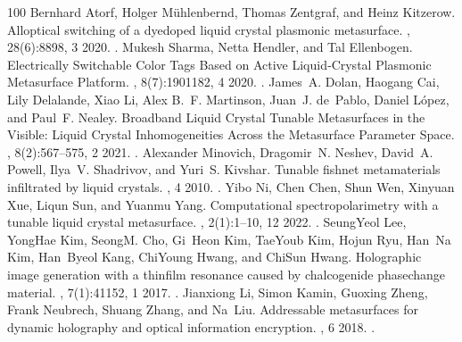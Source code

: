 \documentclass[a4paper,10pt,english,openany,oneside]{jupyterBook}
\begin{document}
\begin{sphinxthebibliography}{100}
\sphinxAtStartPar
Bernhard Atorf, Holger Mühlenbernd, Thomas Zentgraf, and Heinz Kitzerow. All\sphinxhyphen{}optical switching of a dye\sphinxhyphen{}doped liquid crystal plasmonic metasurface. , 28(6):8898, 3 2020. .
\sphinxAtStartPar
Mukesh Sharma, Netta Hendler, and Tal Ellenbogen. Electrically Switchable Color Tags Based on Active Liquid‐Crystal Plasmonic Metasurface Platform. , 8(7):1901182, 4 2020. .
\sphinxAtStartPar
James A. Dolan, Haogang Cai, Lily Delalande, Xiao Li, Alex B. F. Martinson, Juan J. de Pablo, Daniel López, and Paul F. Nealey. Broadband Liquid Crystal Tunable Metasurfaces in the Visible: Liquid Crystal Inhomogeneities Across the Metasurface Parameter Space. , 8(2):567–575, 2 2021. .
\sphinxAtStartPar
Alexander Minovich, Dragomir N. Neshev, David A. Powell, Ilya V. Shadrivov, and Yuri S. Kivshar. Tunable fishnet metamaterials infiltrated by liquid crystals. , 4 2010. .
\sphinxAtStartPar
Yibo Ni, Chen Chen, Shun Wen, Xinyuan Xue, Liqun Sun, and Yuanmu Yang. Computational spectropolarimetry with a tunable liquid crystal metasurface. , 2(1):1–10, 12 2022. .
\sphinxAtStartPar
Seung\sphinxhyphen{}Yeol Lee, Yong\sphinxhyphen{}Hae Kim, Seong\sphinxhyphen{}M. Cho, Gi Heon Kim, Tae\sphinxhyphen{}Youb Kim, Hojun Ryu, Han Na Kim, Han Byeol Kang, Chi\sphinxhyphen{}Young Hwang, and Chi\sphinxhyphen{}Sun Hwang. Holographic image generation with a thin\sphinxhyphen{}film resonance caused by chalcogenide phase\sphinxhyphen{}change material. , 7(1):41152, 1 2017. .
\sphinxAtStartPar
Jianxiong Li, Simon Kamin, Guoxing Zheng, Frank Neubrech, Shuang Zhang, and Na Liu. Addressable metasurfaces for dynamic holography and optical information encryption. , 6 2018. .

\end{sphinxthebibliography}
\end{document}
